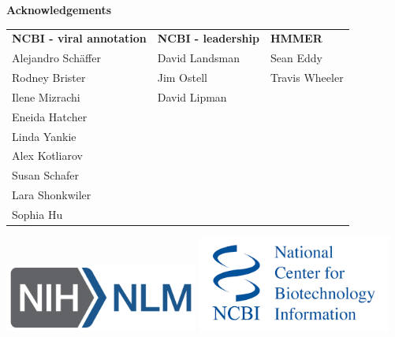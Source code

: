 \documentclass[landscape]{slides}
\begin{document}
\begin{slide}

\large
\begin{center}
\large{\textbf{Acknowledgements}} \\

\normalsize
\vspace{0.75in}

\small
\begin{tabular}{l|l|l}
\textbf{NCBI - viral annotation} & \textbf{NCBI - leadership} &  \textbf{HMMER} \\
Alejandro Sch\"{a}ffer           & David Landsman             & Sean Eddy \\
Rodney Brister                   & Jim Ostell                 & Travis Wheeler \\
Ilene Mizrachi                   & David Lipman               & \\
Eneida Hatcher                   & & \\
Linda Yankie                     & & \\
Alex Kotliarov                   & & \\
Susan Schafer                    & & \\
Lara Shonkwiler                  & & \\
Sophia Hu                        & & \\
\end{tabular}

\includegraphics[width=2.5in]{figs/NIH_NLM_ABRV_2C_4-white}
\includegraphics[width=2.5in]{figs/ncbi-logo}

\end{center}

\vfill
\end{slide}
\end{document}
